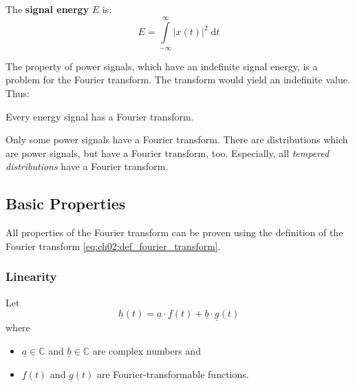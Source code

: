\begin{refsection}
The  \textbf{signal energy} $E$ is:
\begin{equation}
	E = \int\limits_{-\infty}^{\infty} \left|x(t)\right|^2 \; \mathrm{d} t
\end{equation}

The property of power signals, which have an indefinite signal energy, is a problem for the Fourier transform. The transform would yield an indefinite value. Thus:
\begin{fact}
	Every energy signal has a Fourier transform.
\end{fact}

Only some power signals have a Fourier transform. There are distributions which are power signals, but have a Fourier transform, too. Especially, all \emph{tempered distributions} have a Fourier transform.

\subsection{Basic Properties}

All properties of the Fourier transform can be proven using the definition of the Fourier transform \eqref{eq:ch02:def_fourier_transform}.

\subsubsection{Linearity}

Let
\begin{equation}
	\underline{h}(t) = \underline{a} \cdot \underline{f}(t) + \underline{b} \cdot \underline{g}(t)
\end{equation}
where
\begin{itemize}
	\item $\underline{a} \in \mathbb{C}$ and $\underline{b} \in \mathbb{C}$ are complex numbers and
	\item $\underline{f}(t)$ and $\underline{g}(t)$ are Fourier-transformable functions.
\end{itemize}


\end{refsection}

